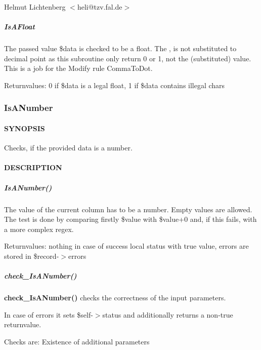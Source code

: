 Helmut Lichtenberg $<$heli@tzv.fal.de$>$

\subparagraph*{IsAFloat\label{IsAFloat_IsAFloat}}


The passed value \$data is checked to be a float. The , is not substituted to
decimal point as this subroutine only return 0 or 1, not the (substituted)
value. This is a job for the Modify rule CommaToDot.



Returnvalues: 0 if \$data is a legal float, 1 if \$data contains illegal chars

\subsubsection{IsANumber\label{IsANumber}}




\paragraph*{SYNOPSIS\label{IsANumber_SYNOPSIS}}


Checks, if the provided data is a number.

\paragraph*{DESCRIPTION\label{IsANumber_DESCRIPTION}}
\subparagraph*{IsANumber()\label{IsANumber_IsANumber_}}


The value of the current column has to be a number.  Empty values are
allowed. The test is done by comparing firstly \$value with \$value+0 and, if
this fails, with a more complex regex.



Returnvalues:
   nothing in case of success
   local status with true value, errors are stored in \$record-$>$errors

\subparagraph*{check\_IsANumber()\label{IsANumber_check_IsANumber_}}


\textbf{check\_IsANumber()} checks the correctness of the input parameters.



In case of errors it sets \$self-$>$status and additionally returns a non-true
returnvalue.



Checks are:
   Existence of additional parameters

